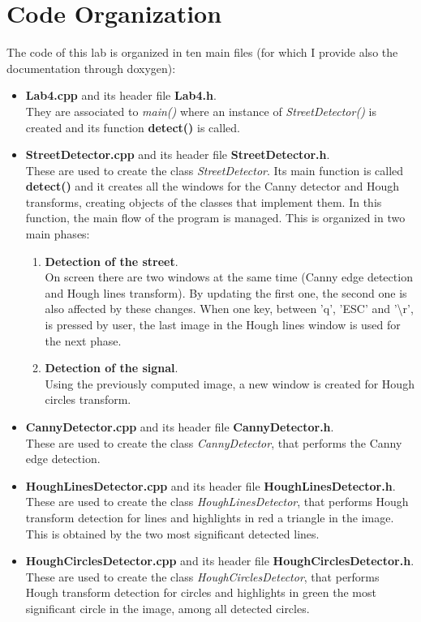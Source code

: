\documentclass{article}
\begin{document}
\section{Code Organization}
The code of this lab is organized in ten main files (for which I provide also the documentation through doxygen):
\begin{itemize}
\item{\textbf{Lab4.cpp} and its header file \textbf{Lab4.h}.\\
They are associated to \textit{main()} where an instance of \textit{StreetDetector()} is created and its function \textbf{detect()} is called.}
\item{\textbf{StreetDetector.cpp} and its header file \textbf{StreetDetector.h}.\\
These are used to create the class \textit{StreetDetector}. Its main function is called \textbf{detect()} and it creates all the windows for the Canny detector and Hough transforms, creating objects of the classes that implement them. In this function, the main flow of the program is managed. This is organized in two main phases:
\begin{enumerate}
\item{\textbf{Detection of the street}.\\
On screen there are two windows at the same time (Canny edge detection and Hough lines transform). By updating the first one, the second one is also affected by these changes. When one key, between 'q', 'ESC' and '\textbackslash{r}', is pressed by user, the last image in the Hough lines window is used for the next phase.
}
\item{\textbf{Detection of the signal}.\\
Using the previously computed image, a new window is created for Hough circles transform.
}
\end{enumerate}
}
\item{\textbf{CannyDetector.cpp} and its header file \textbf{CannyDetector.h}.\\
These are used to create the class \textit{CannyDetector}, that performs the Canny edge detection.}
\item{\textbf{HoughLinesDetector.cpp} and its header file \textbf{HoughLinesDetector.h}.\\
These are used to create the class \textit{HoughLinesDetector}, that performs Hough transform detection for lines and highlights in red a triangle in the image. This is obtained by the two most significant detected lines.}
\item{\textbf{HoughCirclesDetector.cpp} and its header file \textbf{HoughCirclesDetector.h}.\\
These are used to create the class \textit{HoughCirclesDetector}, that performs Hough transform detection for circles and highlights in green the most significant circle in the image, among all detected circles.}
\end{itemize}
\end{document}
